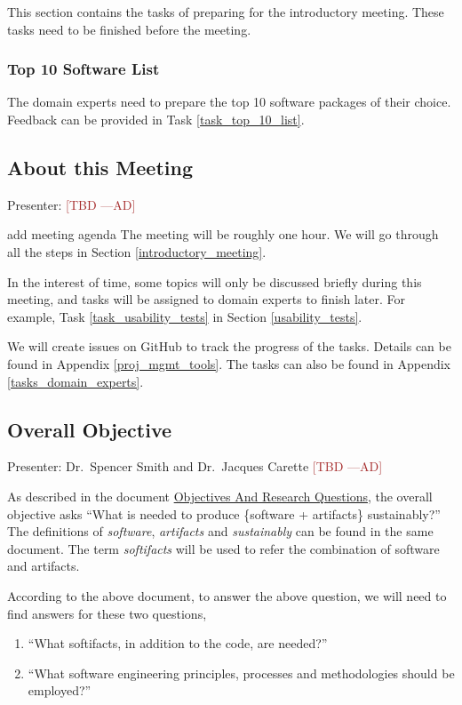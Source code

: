 \documentclass[12pt]{article}
\newcommand{\authornote}[3]{\textcolor{#1}{[#3 ---#2]}}
\newcommand{\authornote}[3]{}
\newcommand{\ad}[1]{\authornote{brown}{AD}{#1}} %
\begin{document}
This section contains the tasks of preparing for the introductory meeting. These
tasks need to be finished before the meeting.

\subsubsection{Top 10 Software List}
\label{top_10_list}

The domain experts need to prepare the top 10 software packages of their choice.
Feedback can be provided in Task \ref{task_top_10_list}.

\subsection{About this Meeting}
Presenter: \ad{TBD}

add meeting agenda
The meeting will be roughly one hour. We will go
through all the steps in Section \ref{introductory_meeting}.

In the interest of time, some topics will only be discussed briefly during this
meeting, and tasks will be assigned to domain experts to finish later. For
example, Task \ref{task_usability_tests} in Section \ref{usability_tests}.

We will create issues on GitHub to track the progress of the tasks. Details can
be found in Appendix \ref{proj_mgmt_tools}. The tasks can also be found in
Appendix \ref{tasks_domain_experts}.

\subsection{Overall Objective}
\label{overall_objective}
Presenter: Dr.\ Spencer Smith and Dr.\ Jacques Carette \ad{TBD}

As described in the document 
\href{https://github.com/smiths/AIMSS/blob/master/OverallResearchProposal/ObjectivesAndResearchQuestions.pdf}{Objectives
And Research Questions}, the overall objective asks ``What is needed to produce
\{software + artifacts\} sustainably?'' The definitions of \emph{software},
\emph{artifacts} and \emph{sustainably} can be found in the same document. The
term \emph{softifacts} will be used to refer the combination of software and
artifacts.

According to the above document, to answer the above question, we will need to
find answers for these two questions,
\begin{enumerate}
\item ``What softifacts, in addition to the code, are needed?''
\item ``What software engineering principles, processes and methodologies should
be employed?''
\end{enumerate}
\end{document}
